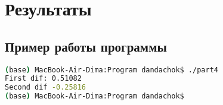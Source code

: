 \section*{Результаты}

\subsection*{Пример работы программы}
\begin{lstlisting}[language=bash]
(base) MacBook-Air-Dima:Program dandachok$ ./part4
First dif: 0.51082
Second dif -0.25816
(base) MacBook-Air-Dima:Program dandachok$
\end{lstlisting}

\pagebreak